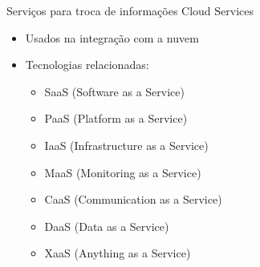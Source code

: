 \documentclass[t]{beamer}
\begin{document}
\begin{frame}{Serviços para troca de informações}
Cloud Services
\begin{itemize}
	\item Usados na integração com a nuvem
	\item Tecnologias relacionadas:
	\begin{itemize}
		\item SaaS (Software as a Service)
		\item PaaS (Platform as a Service)
		\item IaaS (Infrastructure as a Service)
		\item MaaS (Monitoring as a Service)
		\item CaaS (Communication as a Service)
		\item DaaS (Data as a Service)
		\item XaaS (Anything as a Service)
	\end{itemize}	
\end{itemize}
\end{frame}

\frame{\titlepage}
\end{document}
